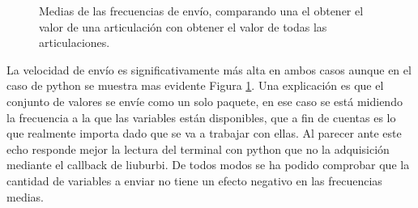 \documentclass[12pt,a4paper,final,twoside]{book}
\begin{document}
\begin{figure}[H]
	\centering
{}
	 \caption{Medias de las frecuencias de envío, comparando una el obtener el valor de una articulación con obtener el valor de todas las articulaciones.}
  \label{fig:compAllOne}
\end{figure}
La velocidad de envío es significativamente más alta en ambos casos aunque en el caso de python se muestra mas evidente Figura \ref{fig:compAllOne}. Una explicación es que el conjunto de valores se envíe como un solo paquete, en ese caso se está midiendo la frecuencia a la que las variables están disponibles, que a fin de cuentas es lo que realmente importa dado que se va a trabajar con ellas. Al parecer ante este echo responde mejor la lectura del terminal con python que no la adquisición mediante el callback de liuburbi. De todos modos se ha podido comprobar que la cantidad de variables a enviar no tiene un efecto negativo en las frecuencias medias.
\end{document}
